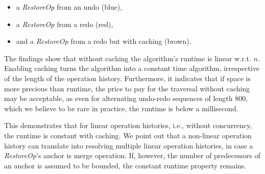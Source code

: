 \documentclass[sigplan]{acmart}
\newcommand{\restopkind}{\textit{RestoreOp}}
\begin{document}
\begin{itemize}
  \item a \restopkind{} from an undo (blue),
  \item a \restopkind{} from a redo (red),
  \item and a \restopkind{} from a redo but with caching (brown).
\end{itemize}

The findings show that without caching the algorithm's runtime is linear
w.r.t. $n$.
Enabling caching turns the algorithm into a constant time algorithm,
irrespective of the length of the operation history.
Furthermore, it indicates that if space is more precious than runtime,
the price to pay for the traversal without caching may be acceptable,
as even for alternating undo-redo sequences of length 800,
which we believe to be rare in practice, the runtime is below a millisecond.

This demonstrates that for linear operation histories, i.e., without concurrency,
the runtime is constant with caching.
We point out that a non-linear operation history can translate into resolving
multiple linear operation histories, in case a \restopkind{}'s anchor
is merge operation.
If, however, the number of predecessors of an anchor is assumed to be bounded,
the constant runtime property remains.
\end{document}
